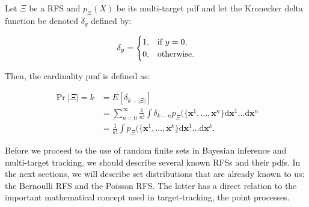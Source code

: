 \begin{definition}
    Let $\Xi$ be a RFS and $p_\Xi(X)$ be its multi-target pdf and let the Kronecker delta function be denoted $\delta_y$ defined by:

    \begin{equation}
        \delta_y = \begin{cases}
            1, & \textup{if } y = 0, \\
            0, & \textup{otherwise}.
        \end{cases}
    \end{equation}
    
    Then, the cardinality pmf is defined as:

    \begin{align}
        \Pr{|\Xi| = k}
        &= E[\delta_{k - |\Xi|}] \\
        &= \sum_{n=0}^\infty \frac{1}{n !}
        \int \delta_{k - n}
        p_\Xi(\{\mathbf{x}^1, \ldots, \mathbf{x}^n\}
        \mathrm{d}\mathbf{x}^1 \ldots \mathrm{d}\mathbf{x}^n \\
        &= \frac{1}{k !}
        \int p_\Xi(\{\mathbf{x}^1, \ldots, \mathbf{x}^k\}
        \mathrm{d}\mathbf{x}^1 \ldots \mathrm{d}\mathbf{x}^k.
    \end{align}
\end{definition}

Before we proceed to the use of random finite sets in Bayesian inference and multi-target tracking, we should describe several known RFSs and their pdfs. In the next sections, we will describe set distributions that are already known to us: the Bernoulli RFS and the Poisson RFS. The latter has a direct relation to the important mathematical concept used in target-tracking, the point processes.
